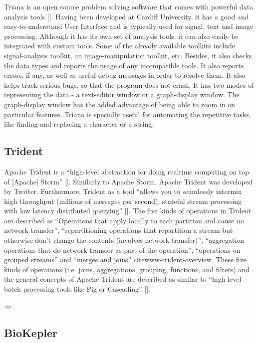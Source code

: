 Triana is an open source problem solving software that comes with
powerful data analysis tools [\cite{trianaDocumentation-1}].  Having
been developed at Cardiff University, it has a good and
easy-to-understand User Interface and is typically used for signal,
text and image processing.  Although it has its own set of analysis
tools, it can also easily be integrated with custom tools.  Some of
the already available toolkits include signal-analysis toolkit, an
image-manipulation toolkit, etc.  Besides, it also checks the data
types and reports the usage of any incompatible tools.  It also
reports errors, if any, as well as useful debug messages in order to
resolve them.  It also helps track serious bugs, so that the program
does not crash.  It has two modes of representing the data - a
text-editor window or a graph-display window.  The graph-display
window has the added advantage of being able to zoom in on particular
features.  Triana is specially useful for automating the repetitive
tasks, like finding-and-replacing a character or a string.
   
\subsection{Trident}

Apache Trident is a ``high-level abstraction for doing realtime
computing on top of [Apache]
Storm'' [\cite{www-trident-tutorial}]. Similarly to Apache Storm, Apache
Trident was developed by Twitter.  Furthermore, Trident as a tool
``allows you to seamlessly intermix high throughput (millions of
messages per second), stateful stream processing with low latency
distributed querying'' [\cite{www-trident-tutorial}].  The five kinds of
operations in Trident are described as ``Operations that apply locally
to each partition and cause no network transfer'', ``repartitioning
operations that repartition a stream but otherwise don't change the
contents (involves network transfer)'', ``aggregation operations that
do network transfer as part of the operation'', ``operations on
grouped streams'' and ``merges and joins'' cite{www-trident-overview}.
These five kinds of operations (i.e. joins, aggregations, grouping,
functions, and filters) and the general concepts of Apache Trident are
described as similar to ``high level batch processing tools like Pig
or Cascading'' [\cite{www-trident-tutorial}].

-o-

\subsection{BioKepler}
    
